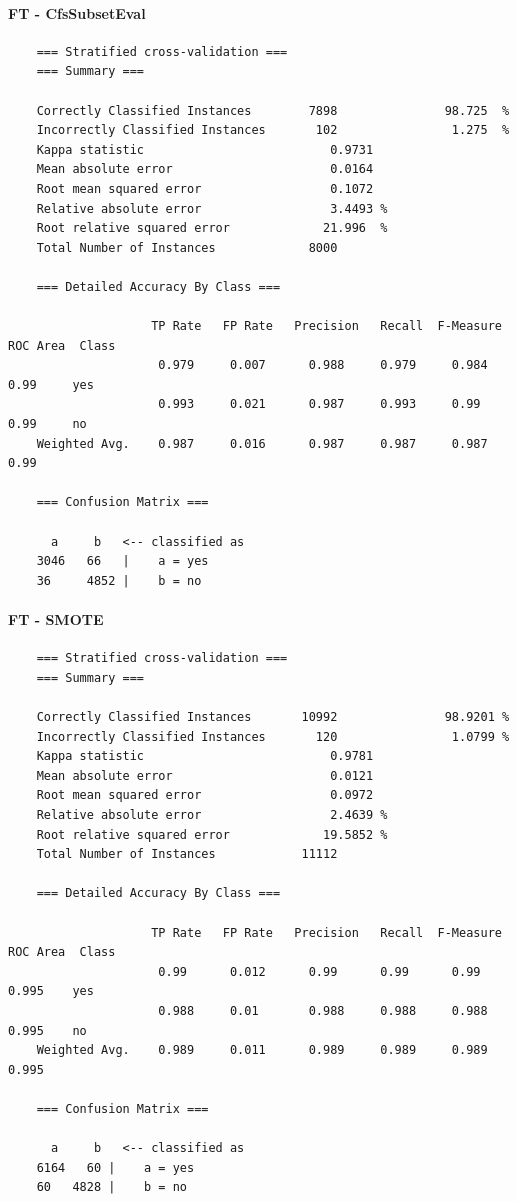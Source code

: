 \paragraph{FT - CfsSubsetEval}
{\footnotesize
	\begin{verbatim}
	=== Stratified cross-validation ===
	=== Summary ===
	
	Correctly Classified Instances        7898               98.725  %
	Incorrectly Classified Instances       102                1.275  %
	Kappa statistic                          0.9731
	Mean absolute error                      0.0164
	Root mean squared error                  0.1072
	Relative absolute error                  3.4493 %
	Root relative squared error             21.996  %
	Total Number of Instances             8000     
	
	=== Detailed Accuracy By Class ===
	
	                TP Rate   FP Rate   Precision   Recall  F-Measure   ROC Area  Class
	                 0.979     0.007      0.988     0.979     0.984      0.99     yes
	                 0.993     0.021      0.987     0.993     0.99       0.99     no
	Weighted Avg.    0.987     0.016      0.987     0.987     0.987      0.99 
	
	=== Confusion Matrix ===
	
	  a     b   <-- classified as
	3046   66   |    a = yes
	36     4852 |    b = no
	\end{verbatim}
}
\paragraph{FT - SMOTE}
{\footnotesize
	\begin{verbatim}
	=== Stratified cross-validation ===
	=== Summary ===
	
	Correctly Classified Instances       10992               98.9201 %
	Incorrectly Classified Instances       120                1.0799 %
	Kappa statistic                          0.9781
	Mean absolute error                      0.0121
	Root mean squared error                  0.0972
	Relative absolute error                  2.4639 %
	Root relative squared error             19.5852 %
	Total Number of Instances            11112     
	
	=== Detailed Accuracy By Class ===
	
	                TP Rate   FP Rate   Precision   Recall  F-Measure   ROC Area  Class
	                 0.99      0.012      0.99      0.99      0.99       0.995    yes
	                 0.988     0.01       0.988     0.988     0.988      0.995    no
	Weighted Avg.    0.989     0.011      0.989     0.989     0.989      0.995
	
	=== Confusion Matrix ===
	
	  a     b   <-- classified as
	6164   60 |    a = yes
	60   4828 |    b = no
	\end{verbatim}
}
